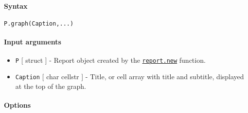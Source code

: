 


	\paragraph{Syntax}\label{syntax}

\begin{verbatim}
P.graph(Caption,...)
\end{verbatim}

\paragraph{Input arguments}\label{input-arguments}

\begin{itemize}
\item
  \texttt{P} {[} struct {]} - Report object created by the
  \href{report/new}{\texttt{report.new}} function.
\item
  \texttt{Caption} {[} char \textbar{} cellstr {]} - Title, or cell
  array with title and subtitle, displayed at the top of the graph.
\end{itemize}

\paragraph{Options}\label{options}


